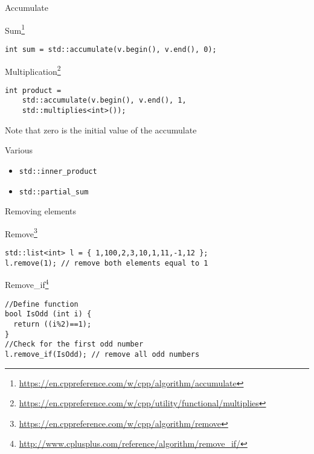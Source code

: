 \documentclass[12pt,t]{beamer}
\begin{document}
\begin{frame}[fragile]{Accumulate}

\begin{block}{Sum\footnote{\tiny\url{https://en.cppreference.com/w/cpp/algorithm/accumulate}}}
\vspace{-0.25cm}
\begin{lstlisting}
int sum = std::accumulate(v.begin(), v.end(), 0);
\end{lstlisting}
\end{block}
\vspace{-0.25cm}
\begin{block}{Multiplication\footnote{\tiny\url{https://en.cppreference.com/w/cpp/utility/functional/multiplies}}}
\begin{lstlisting}
int product = 
	std::accumulate(v.begin(), v.end(), 1, 
	std::multiplies<int>());
\end{lstlisting}
\end{block}
Note that zero is the initial value of the accumulate

\begin{block}{Various}
\begin{itemize}
\item \lstinline|std::inner_product| 
\item \lstinline|std::partial_sum|
\end{itemize}
\end{block}

\end{frame}

\begin{frame}[fragile]{Removing elements}

\begin{block}{Remove\footnote{\tiny\url{https://en.cppreference.com/w/cpp/algorithm/remove}}}
\begin{lstlisting}
std::list<int> l = { 1,100,2,3,10,1,11,-1,12 };
l.remove(1); // remove both elements equal to 1
\end{lstlisting}
\end{block}
\vspace{-0.25cm}
\begin{block}{Remove\_if\footnote{\tiny\url{http://www.cplusplus.com/reference/algorithm/remove_if/}}}
\begin{lstlisting}
//Define function
bool IsOdd (int i) {
  return ((i%2)==1);
}
//Check for the first odd number
l.remove_if(IsOdd); // remove all odd numbers
\end{lstlisting}
\end{block}


\end{frame}
\end{document}
